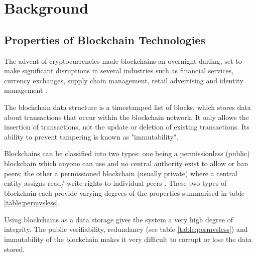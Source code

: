 
\chapter{Background}

    \graphicspath{{Chapter2/Figs/Raster/}{Chapter2/Figs/PDF/}{Chapter2/Figs/}}

\section{Properties of Blockchain Technologies}

The advent of cryptocurrencies made blockchains an overnight darling, set to make significant disruptions 
in several industries such as financial services, currency exchanges, supply chain management, retail 
advertising and identity management \citep{forbes2017industries}.

The blockchain data structure is a timestamped list of blocks, which stores data about transactions
that occur within the blockchain network. It only allows the insertion of transactions, not the update 
or deletion of existing transactions. Its ability to prevent tampering is known as "immutability". \citep[p.182]{xu2016blockchain}

Blockchains can be classified into two types: one being a permissionless (public) blockchain which anyone can 
use and no central authority exist to allow or ban peers; the other a permissioned blockchain (usually private)
where a central entity assigns read/ write rights to individual peers \citep[p.1]{wust2017you}. These two types of 
blockchain each provide varying degrees of the properties summarised in table \ref{table:permvsless}.

Using blockchains as a data storage gives the system a very high degree of integrity. The public verifiability, 
redundancy (see table \ref{table:permvsless}) and immutability of the blockchain makes it very difficult to 
corrupt or lose the data stored.


